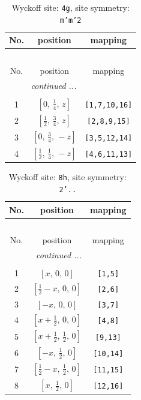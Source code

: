 \documentclass[fleqn,8pt]{jsarticle}
\begin{document}
\renewcommand{\arraystretch}{1.2}
\begin{longtable}{ccc}
\caption{Wyckoff site: {\tt 4g}, site symmetry: {\tt m'm'2}}
 \\
 \hline \hline
No. & position & mapping \\ \hline \endfirsthead

\multicolumn{2}{l}{\tablename\ \thetable{}} \\
 \hline \hline
No. & position & mapping \\ \hline \endhead

 \hline \hline
\multicolumn{2}{r}{\footnotesize\it continued ...} \\ \endfoot

 \hline \hline
\multicolumn{2}{r}{} \\ \endlastfoot

1 & $\left[ 0,\, \frac{1}{4},\, z \right]$ & {\tt [1,7,10,16]} \\ \hline
2 & $\left[ \frac{1}{2},\, \frac{3}{4},\, z \right]$ & {\tt [2,8,9,15]} \\ \hline
3 & $\left[ 0,\, \frac{3}{4},\, - z \right]$ & {\tt [3,5,12,14]} \\ \hline
4 & $\left[ \frac{1}{2},\, \frac{1}{4},\, - z \right]$ & {\tt [4,6,11,13]} \\
\end{longtable}
\renewcommand{\arraystretch}{1.2}
\begin{longtable}{ccc}
\caption{Wyckoff site: {\tt 8h}, site symmetry: {\tt 2'..}}
 \\
 \hline \hline
No. & position & mapping \\ \hline \endfirsthead

\multicolumn{2}{l}{\tablename\ \thetable{}} \\
 \hline \hline
No. & position & mapping \\ \hline \endhead

 \hline \hline
\multicolumn{2}{r}{\footnotesize\it continued ...} \\ \endfoot

 \hline \hline
\multicolumn{2}{r}{} \\ \endlastfoot

1 & $\left[ x,\, 0,\, 0 \right]$ & {\tt [1,5]} \\ \hline
2 & $\left[ \frac{1}{2} - x,\, 0,\, 0 \right]$ & {\tt [2,6]} \\ \hline
3 & $\left[ - x,\, 0,\, 0 \right]$ & {\tt [3,7]} \\ \hline
4 & $\left[ x + \frac{1}{2},\, 0,\, 0 \right]$ & {\tt [4,8]} \\ \hline
5 & $\left[ x + \frac{1}{2},\, \frac{1}{2},\, 0 \right]$ & {\tt [9,13]} \\ \hline
6 & $\left[ - x,\, \frac{1}{2},\, 0 \right]$ & {\tt [10,14]} \\ \hline
7 & $\left[ \frac{1}{2} - x,\, \frac{1}{2},\, 0 \right]$ & {\tt [11,15]} \\ \hline
8 & $\left[ x,\, \frac{1}{2},\, 0 \right]$ & {\tt [12,16]} \\
\end{longtable}
\end{document}
